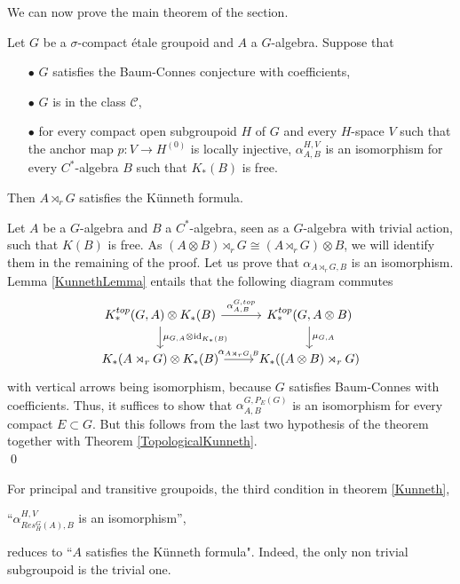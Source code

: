 We can now prove the main theorem of the section.

\begin{thm}\label{Kunneth}
Let $G$ be a $\sigma$-compact étale groupoid and $A$ a $G$-algebra. Suppose that 
\begin{itemize}
\item[$\bullet$] $G$ satisfies the Baum-Connes conjecture with coefficients,
\item[$\bullet$] $G$ is in the class $\mathcal C$,
\item[$\bullet$] for every compact open subgroupoid $H$ of $G$ and every $H$-space $V$ such that the anchor map $p : V \rightarrow H^{(0)}$ is locally injective, $\alpha_{A,B}^{H,V}$ is an isomorphism for every $C^*$-algebra $B$ such that $K_*(B)$ is free.
\end{itemize} 
Then $A\rtimes_r G$ satisfies the Künneth formula.
\end{thm}

\begin{dem} %

Let $A$ be a $G$-algebra and $B$ a $C^*$-algebra, seen as a $G$-algebra with trivial action, such that $K(B)$ is free. As $(A\otimes B)\rtimes_r G \cong (A\rtimes_r G)\otimes B$, we will identify them in the remaining of the proof. Let us prove that $\alpha_{A\rtimes_r G,B}$ is an isomorphism.\\

Lemma \ref{KunnethLemma} entails that the following diagram commutes
\[\begin{tikzcd}
K_*^{top}(G,A)\otimes K_*(B) \arrow{r}{\alpha^{G,top}_{A,B}}\arrow{d}{\mu_{G,A}\otimes \text{id}_{K_*(B)}} & 
K_*^{top}(G,A\otimes B) \arrow{d}{\mu_{G,A}} \\
K_*(A\rtimes_r G)\otimes K_*(B) \arrow{r}{\alpha_{A\rtimes_r G,B}} & 
K_*((A\otimes B)\rtimes_r G)
\end{tikzcd}\]
with vertical arrows being isomorphism, because $G$ satisfies Baum-Connes with coefficients. Thus, it suffices to show that $\alpha^{G,P_E(G)}_{A,B}$ is an isomorphism for every compact $E\subset G$. But this follows from the last two hypothesis of the theorem together with Theorem \ref{TopologicalKunneth}.\\ 
\qed
\end{dem}

\begin{rk}
For principal and transitive groupoids, the third condition in theorem \ref{Kunneth},
\begin{center} 
``$\alpha_{Res_H^G(A),B}^{H,V}$ is an isomorphism'',
\end{center}
reduces to ``$A$ satisfies the Künneth formula". Indeed, the only non trivial subgroupoid is the trivial one.
\end{rk}

